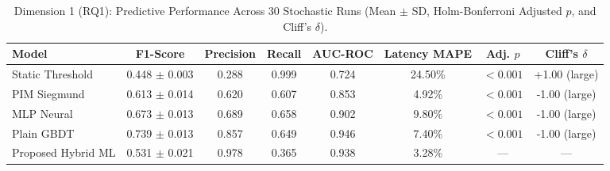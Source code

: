 \begin{table}[t]
\centering
\caption{Dimension 1 (RQ1): Predictive Performance Across 30 Stochastic Runs (Mean $\pm$ SD, Holm-Bonferroni Adjusted $p$, and Cliff's $\delta$).}
\label{tab:res_d1_predictive}
\footnotesize
\begin{tabular}{l c c c c c c c}
\toprule
\textbf{Model} & \textbf{F1-Score} & \textbf{Precision} & \textbf{Recall} & \textbf{AUC-ROC} & \textbf{Latency MAPE} & \textbf{Adj. $p$} & \textbf{Cliff's $\delta$} \\
\midrule
Static Threshold & 0.448 $\pm$ 0.003 & 0.288 & 0.999 & 0.724 & 24.50\% & $<0.001$ & +1.00 (large) \\
PIM Siegmund & 0.613 $\pm$ 0.014 & 0.620 & 0.607 & 0.853 & 4.92\% & $<0.001$ & -1.00 (large) \\
MLP Neural & 0.673 $\pm$ 0.013 & 0.689 & 0.658 & 0.902 & 9.80\% & $<0.001$ & -1.00 (large) \\
Plain GBDT & 0.739 $\pm$ 0.013 & 0.857 & 0.649 & 0.946 & 7.40\% & $<0.001$ & -1.00 (large) \\
Proposed Hybrid ML & 0.531 $\pm$ 0.021 & 0.978 & 0.365 & 0.938 & 3.28\% & --- & --- \\
\bottomrule
\end{tabular}
\end{table}